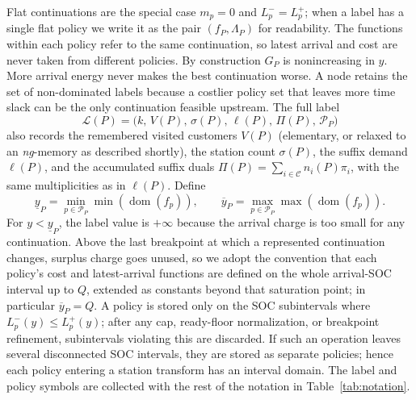 \documentclass[review,3p,authoryear]{elsarticle}
\theoremstyle{plain}
\theoremstyle{definition}
\theoremstyle{remark}
\newcommand{\C}{\mathcal{C}}
\newcommand{\dom}{\operatorname{dom}}
\begin{document}
Flat continuations are the special case $m_p=0$ and $L_p^-=L_p^+$; when a label has
a single flat policy we write it as the pair $(f_P,\Lambda_P)$ for readability.
The functions within each policy refer to the same continuation, so latest
arrival and cost are never taken from different policies. By construction $G_P$ is
nonincreasing in \(y\). More arrival energy never makes the best continuation worse.
A node retains the set of non-dominated labels because a costlier policy set
that leaves more time slack can be the only continuation feasible upstream. The full
label
\begin{equation}
\label{eq:label}
\mathcal{L}(P) = \bigl(k,\,V(P),\,\sigma(P),\,\ell(P),\,\Pi(P),\,\mathcal P_P\bigr)
\end{equation}
also records the remembered visited customers $V(P)$ (elementary, or relaxed to an
\emph{ng}-memory as described shortly), the station count $\sigma(P)$, the suffix
demand $\ell(P)$, and the accumulated suffix duals
$\Pi(P)=\sum_{i\in\C}n_i(P)\pi_i$, with the same multiplicities as in $\ell(P)$.
Define
\[
\underline{y}_P=\min_{p\in\mathcal P_P}\min(\dom(f_p)),\qquad
\overline{y}_P=\max_{p\in\mathcal P_P}\max(\dom(f_p)).
\]
For \(y<\underline{y}_P\), the label value is \(+\infty\) because the arrival
charge is too small for any continuation. Above the last breakpoint at which a
represented continuation changes, surplus charge goes unused, so we adopt the
convention that each policy's cost and latest-arrival functions are defined on
the whole arrival-SOC interval up to \(Q\), extended as constants beyond that
saturation point; in particular \(\overline{y}_P=Q\). A policy is stored only on
the SOC subintervals where \(L_p^-(y)\le L_p^+(y)\); after any cap, ready-floor
normalization, or breakpoint refinement, subintervals violating this are discarded.
If such an operation leaves several disconnected SOC intervals, they are stored as
separate policies; hence each policy entering a station transform has an interval
domain.
The label and policy symbols are
collected with the rest of the notation in Table~\ref{tab:notation}.
\end{document}
